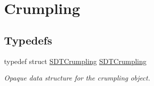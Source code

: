 \hypertarget{group__crumpling}{}\section{Crumpling}
\label{group__crumpling}
\subsection*{Typedefs}
\begin{DoxyCompactItemize}
\item 
\hypertarget{group__crumpling_ga1d5c6cf3fe003cd4d993dcfe0a39f72e}{}typedef struct \hyperlink{group__crumpling_ga1d5c6cf3fe003cd4d993dcfe0a39f72e}{S\+D\+T\+Crumpling} \hyperlink{group__crumpling_ga1d5c6cf3fe003cd4d993dcfe0a39f72e}{S\+D\+T\+Crumpling}\label{group__crumpling_ga1d5c6cf3fe003cd4d993dcfe0a39f72e}

\begin{DoxyCompactList}\small\item\em Opaque data structure for the crumpling object. \end{DoxyCompactList}\end{DoxyCompactItemize}
